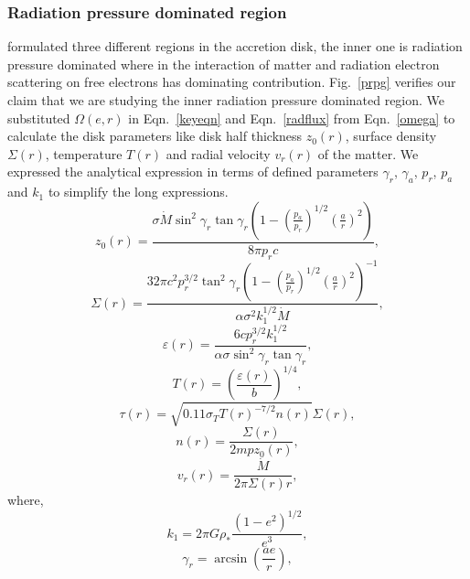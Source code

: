 \documentclass[useAMS,usenatbib]{mn2e}
\begin{document}
\subsubsection{Radiation pressure dominated region}
\citet{1973A&A....24..337S} formulated three different regions in the accretion disk, the inner one is radiation pressure dominated where in the interaction of matter and radiation electron scattering on free electrons has dominating contribution. Fig.~\ref{prpg} verifies our claim that we are studying the inner radiation pressure dominated region. We substituted $\Omega(e,r)$ in Eqn.~\ref{keyeqn} and Eqn.~\ref{radflux} from Eqn.~\ref{omega} to calculate the disk parameters like disk half thickness $z_0(r)$, surface density $\Sigma(r)$, temperature $T(r)$ and radial velocity $v_r(r)$ of the matter. We expressed the analytical expression in terms of defined parameters $\gamma_r$, $\gamma_a$, $p_r$, $p_a$ and $k_1$ to simplify the long expressions.
\begin{equation}
z_0(r) = \frac{\sigma\dot{M}\sin^2\gamma_r\tan\gamma_r\left(1 - \left(\frac{p_a}{p_r}\right)^{1/2}\left(\frac{a}{r}\right)^2\right)}{8\pi p_r c},
\end{equation}
\begin{equation}
\Sigma(r) = \frac{32\pi c^2 p_r^{3/2}\tan^2{\gamma_r}\left(1 - \left(\frac{p_a}{p_r}\right)^{1/2}\left(\frac{a}{r}\right)^2\right)^{-1}}{\alpha\sigma^2 k_1^{1/2}\dot{M}},
\end{equation}
\begin{equation}
\varepsilon(r) = \frac{6c p_r^{3/2}k_1^{1/2}}{\alpha\sigma\sin^2\gamma_r\tan\gamma_r},
\end{equation}
\begin{equation}
T(r) = \left(\frac{\varepsilon(r)}{b}\right)^{1/4},
\end{equation}
\begin{equation}
\tau (r) = \sqrt{0.11\sigma_T T(r)^{-7/2}n(r)}\Sigma(r),
\end{equation}
\begin{equation}
n(r) = \frac{\Sigma(r)}{2mpz_0(r)},
\end{equation}
\begin{equation}
v_r(r) = \frac{\dot{M}}{2\pi\Sigma(r) r},
\end{equation}
where,
\begin{equation}
k_1 = 2\pi G\rho_* \frac{(1-e^2)^{1/2}}{e^3},
\end{equation}
\begin{equation} 
\gamma_r = \arcsin\left(\frac{ae}{r}\right), 
\end{equation}
\end{document}
